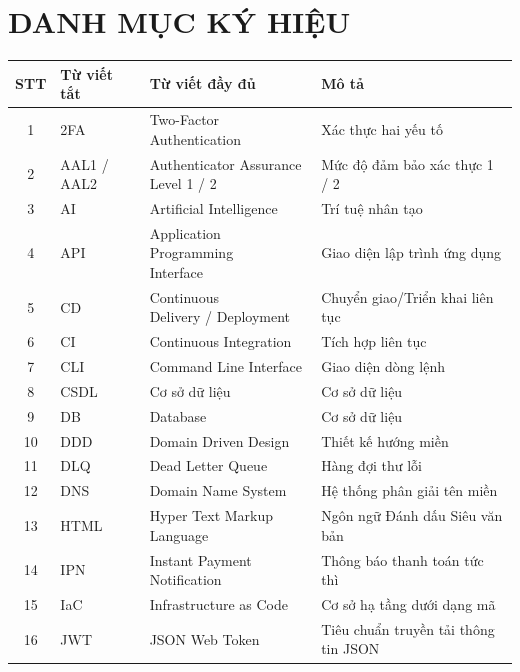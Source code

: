 
\newpage
{\centering \section*{DANH MỤC KÝ HIỆU}} %

\begin{table}[ht]
\centering
\small
\begin{tabular}{|c|p{2.1cm}|p{4.3cm}|p{5.4cm}|}
\hline
\textbf{STT} & \textbf{Từ viết tắt} & \textbf{Từ viết đầy đủ} & \textbf{Mô tả} \\ \hline
1 & 2FA & Two-Factor Authentication & Xác thực hai yếu tố \\ \hline
2 & AAL1 / AAL2 & \makecell[l]{Authenticator Assurance \\ Level 1 / 2} & Mức độ đảm bảo xác thực 1 / 2 \\ \hline
3 & AI & Artificial Intelligence & Trí tuệ nhân tạo \\ \hline
4 & API & \makecell[l]{Application Programming \\ Interface} & Giao diện lập trình ứng dụng \\ \hline
5 & CD & \makecell[l]{Continuous \\ Delivery / Deployment} & Chuyển giao/Triển khai liên tục \\ \hline
6 & CI & Continuous Integration & Tích hợp liên tục \\ \hline
7 & CLI & Command Line Interface & Giao diện dòng lệnh \\ \hline
8 & CSDL & Cơ sở dữ liệu & Cơ sở dữ liệu \\ \hline
9 & DB & Database & Cơ sở dữ liệu \\ \hline
10 & DDD & Domain Driven Design & Thiết kế hướng miền \\ \hline
11 & DLQ & Dead Letter Queue & Hàng đợi thư lỗi \\ \hline
12 & DNS & Domain Name System & Hệ thống phân giải tên miền \\ \hline
13 & HTML & Hyper Text Markup Language & Ngôn ngữ Đánh dấu Siêu văn bản \\ \hline
14 & IPN & Instant Payment Notification & Thông báo thanh toán tức thì \\ \hline
15 & IaC & Infrastructure as Code & Cơ sở hạ tầng dưới dạng mã \\ \hline
16 & JWT & JSON Web Token & Tiêu chuẩn truyền tải thông tin JSON \\ \hline

\end{tabular}
\end{table}
